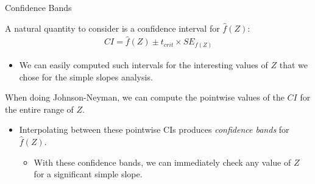 \documentclass{beamer}\usepackage[]{graphicx}\usepackage[]{color}
\begin{document}

\begin{frame}{Confidence Bands}
  
  A natural quantity to consider is a confidence interval for $\hat{f}(Z)$:
  \begin{align*}
    CI = \hat{f}(Z) \pm t_{crit} \times SE_{f(Z)}
  \end{align*}
  \begin{itemize}
  \item We can easily computed such intervals for the interesting values of $Z$ 
    that we chose for the simple slopes analysis.
  \end{itemize}
  \pause
  \vb
  When doing Johnson-Neyman, we can compute the pointwise values of the $CI$ for
  the entire range of $Z$.  
  \vb
  \begin{itemize}
  \item Interpolating between these pointwise CIs produces \emph{confidence 
    bands} for $\hat{f}(Z)$.
    \vc
    \begin{itemize}
    \item With these confidence bands, we can immediately check any value of $Z$ 
      for a significant simple slope.
    \end{itemize}
  \end{itemize}
  
\end{frame}

\watermarkoff %
  
\end{document}
